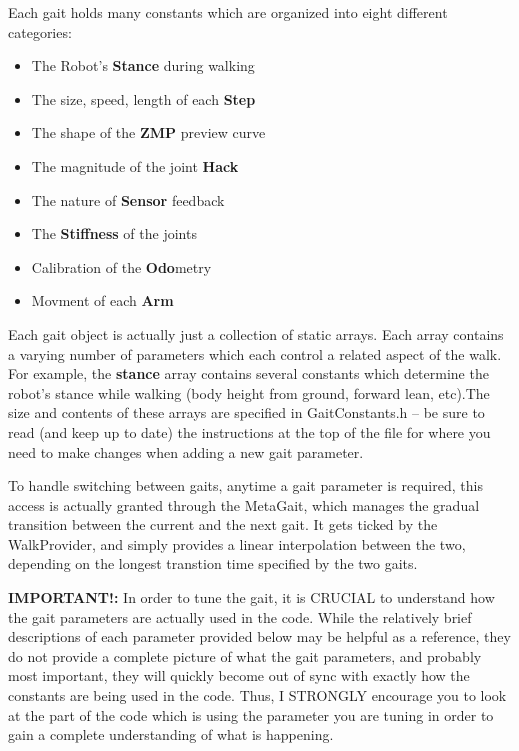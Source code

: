 \documentclass[11pt]{article}
\begin{document}
Each gait holds many constants which are organized into eight
different categories:

\begin{itemize}
\item The Robot's {\bf Stance} during walking
\item The size, speed, length of each {\bf Step}
\item The shape of the {\bf ZMP} preview curve
\item The magnitude of the joint {\bf Hack}
\item The nature of {\bf Sensor} feedback
\item The {\bf Stiffness} of the joints
\item Calibration of the {\bf Odo}metry
\item Movment of each {\bf Arm}
\end{itemize}

Each gait object is actually just a collection of static arrays. Each array
contains a varying number of parameters which each control a related aspect
of the walk. For example, the {\bf stance} array contains several constants
which determine the robot's stance while walking (body height from ground,
forward lean, etc).The size and
contents of these arrays are specified in GaitConstants.h -- be sure to read
(and keep up to date) the instructions at the top of the file for where you
need to make changes when adding a new gait parameter.

To handle switching between gaits, anytime a gait parameter is required,
this access is actually granted through the MetaGait, which manages the
gradual transition between the current and the next gait. It gets ticked
by the WalkProvider, and simply provides a linear interpolation between
the two, depending on the longest transtion time specified by the two gaits.

{\bf IMPORTANT!:} In order to tune the gait, it is CRUCIAL to understand how
the gait parameters are actually used in the code. While the relatively brief
descriptions of each parameter provided below may be helpful as a reference,
they do not provide a complete picture of what the gait parameters, and probably
most important, they will quickly become out of sync with exactly how the
constants are being used in the code. Thus, I STRONGLY encourage you to look
at the part of the code which is using the parameter you are tuning in order
to gain a complete understanding of what is happening.
\end{document}
